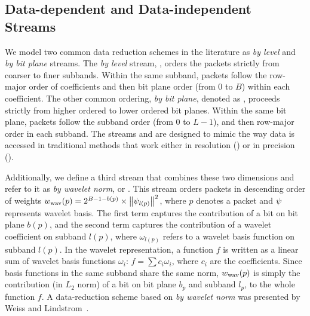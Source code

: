 \subsection{Data-dependent and Data-independent Streams} \label{sec:static-dynamic-streams}

We model two common data reduction schemes in the literature as \emph{by level} and \emph{by bit
plane} streams. The \emph{by level} stream, \slvl, orders the packets strictly from coarser to finer
subbands. Within the same subband, packets follow the row-major order of coefficients 
 and
then bit plane order (from 0 to $B$) within each coefficient. 
The other common ordering, \emph{by
bit plane}, denoted as \sbit, proceeds strictly from higher ordered to lower ordered bit planes.
Within the same bit plane, packets follow the subband order (from $0$ to $L-1$), and then row-major
order in each subband. The streams \slvl and \sbit are designed to mimic the way data is accessed in
traditional methods that work either in resolution (\slvl) or in precision (\sbit).

Additionally, we define a third stream that combines these two dimensions and refer to it as
\emph{by wavelet norm}, or \swav. This stream orders packets in descending order of weights
$\wwav(p)=2^{B-1-b(p)}\times \norm{\wbas_{l(p)}}^2$, 
where $p$ denotes a packet and $\wbas$ represents wavelet basis. The first term
captures the contribution of a bit on bit plane $b(p)$, and the second term captures the
contribution of a wavelet coefficient on subband $l(p)$, where $\omega_{l(p)}$ refers to a wavelet
basis function 
%
%
on subband $l(p)$. In the wavelet representation, a function $f$ is written as a
linear sum of wavelet basis functions $\omega_i$: $f=\sum{c_i\omega_i}$, where $c_i$ are the
coefficients. Since basis functions in the same subband share the same norm, $\wwav(p)$ is simply
the contribution (in $L_2$ norm) of a bit on bit plane $b_p$ and subband $l_p$, to the whole
function $f$. A data-reduction scheme based on \emph{by wavelet norm} was presented by 
Weiss and Lindstrom~\cite{weiss}.

